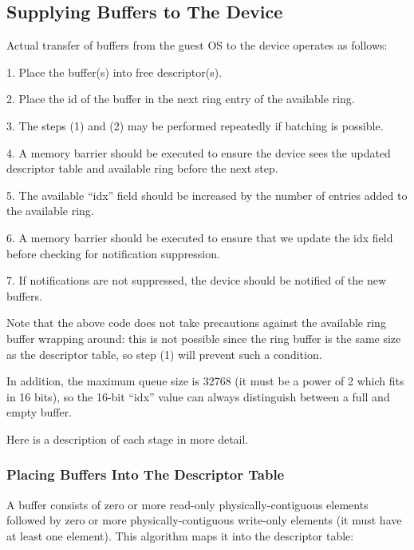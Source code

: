 \subsection{Supplying Buffers to The Device}\label{sec:General Initialization And Device Operation / Device Operation / Supplying Buffers to The Device}

Actual transfer of buffers from the guest OS to the device
operates as follows:

1. Place the buffer(s) into free descriptor(s).

2. Place the id of the buffer in the next ring entry of the
  available ring.

3. The steps (1) and (2) may be performed repeatedly if batching
  is possible.

4. A memory barrier should be executed to ensure the device sees
  the updated descriptor table and available ring before the next
  step.

5. The available “idx” field should be increased by the number of
  entries added to the available ring.

6. A memory barrier should be executed to ensure that we update
  the idx field before checking for notification suppression.

7. If notifications are not suppressed, the device should be
  notified of the new buffers.

Note that the above code does not take precautions against the
available ring buffer wrapping around: this is not possible since
the ring buffer is the same size as the descriptor table, so step
(1) will prevent such a condition.

In addition, the maximum queue size is 32768 (it must be a power
of 2 which fits in 16 bits), so the 16-bit “idx” value can always
distinguish between a full and empty buffer.

Here is a description of each stage in more detail.

\subsubsection{Placing Buffers Into The Descriptor Table}\label{sec:General Initialization And Device Operation / Device Operation / Supplying Buffers to The Device / Placing Buffers Into The Descriptor Table}

A buffer consists of zero or more read-only physically-contiguous
elements followed by zero or more physically-contiguous
write-only elements (it must have at least one element). This
algorithm maps it into the descriptor table:

